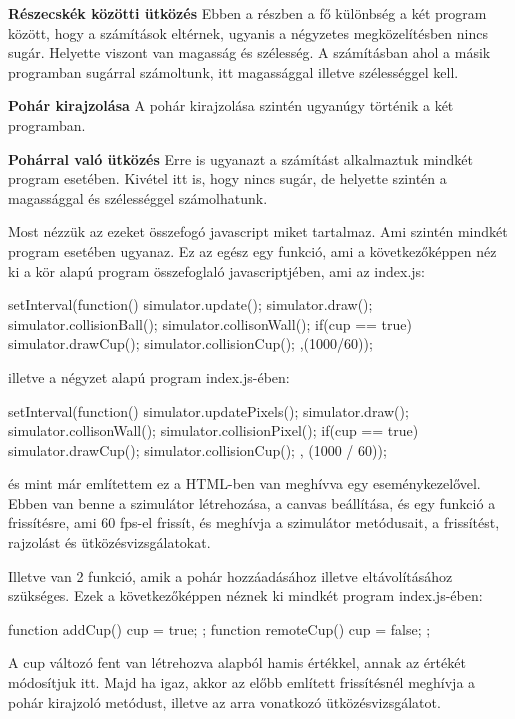\textbf{Részecskék közötti ütközés}
Ebben a részben a fő különbség a két program között, hogy a számítások eltérnek, ugyanis a négyzetes megközelítésben nincs sugár. Helyette viszont van magasság és szélesség. A számításban ahol a másik programban sugárral számoltunk, itt magassággal illetve szélességgel kell. 

\textbf{Pohár kirajzolása}
A pohár kirajzolása szintén ugyanúgy történik a két programban. 

\textbf{Pohárral való ütközés}
Erre is ugyanazt a számítást alkalmaztuk mindkét program esetében. Kivétel itt is, hogy nincs sugár, de helyette szintén a magassággal és szélességgel számolhatunk.



Most nézzük az ezeket összefogó javascript miket tartalmaz. Ami szintén mindkét program esetében ugyanaz. Ez az egész egy funkció, ami a következőképpen néz ki a kör alapú program összefoglaló javascriptjében, ami az index.js:
\begin{java}
setInterval(function()
{
  simulator.update();
  simulator.draw();
  simulator.collisionBall();
  simulator.collisonWall();
  if(cup == true)
  {
    simulator.drawCup();
    simulator.collisionCup();
  }		
},(1000/60));
	
\end{java}
illetve a négyzet alapú program index.js-ében:
\begin{java}
setInterval(function()
{
  simulator.updatePixels();
  simulator.draw();
  simulator.collisonWall();
  simulator.collisionPixel();
  if(cup == true)
  {
    simulator.drawCup();
    simulator.collisionCup();
  }
}, (1000 / 60));
\end{java}
és mint már említettem ez a HTML-ben van meghívva egy eseménykezelővel. Ebben van benne a szimulátor létrehozása, a canvas beállítása, és egy funkció a frissítésre, ami 60 fps-el frissít, és meghívja a szimulátor metódusait, a frissítést, rajzolást és ütközésvizsgálatokat. 

Illetve van 2 funkció, amik a pohár hozzáadásához illetve eltávolításához szükséges. Ezek a következőképpen néznek ki mindkét program index.js-ében:
\begin{java}
function addCup(){
  cup = true;
};
function remoteCup(){
  cup = false;
};
\end{java}
A cup változó fent van létrehozva alapból hamis értékkel, annak az értékét módosítjuk itt. Majd ha igaz, akkor az előbb említett frissítésnél meghívja a pohár kirajzoló metódust, illetve az arra vonatkozó ütközésvizsgálatot.


